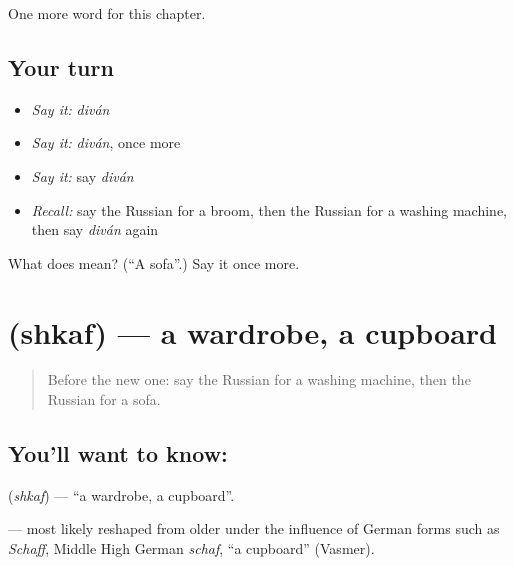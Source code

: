 \begin{grammarlens}[title={What you've built}]
One more word for this chapter.
\end{grammarlens}

\subsection*{Your turn}
\begin{itemize}
\raggedright
  \item \emph{Say it:} \emph{diván}
  \item \emph{Say it:} \emph{diván}, once more
  \item \emph{Say it:} say \emph{diván}
  \item \emph{Recall:} say the Russian for a broom, then the Russian for a washing machine, then say \emph{diván} again
\end{itemize}

\begin{tcolorbox}[breakable,colback=teal!4,colframe=teal!35!black,title={Before you move on}]
What does  mean? (\textquotedblleft{}A sofa\textquotedblright{}.) Say it once more.
\end{tcolorbox}
\section[\texorpdfstring{\ru{шкаф} (shkaf)}{шкаф (shkaf)}]{ (shkaf) — a wardrobe, a cupboard}

\label{lesson:RU-C97-wardrobe}



\begin{quote}
Before the new one: say the Russian for a washing machine, then the Russian for a sofa.
\end{quote}

\subsection*{You'll want to know: }
\textbf{} (\emph{shkaf}) — \textquotedblleft{}a wardrobe, a cupboard\textquotedblright{}.

\begin{cousinweb}
\textbf{} — most likely reshaped from older \emph{} under the influence of German forms such as \emph{Schaff}, Middle High German \emph{schaf}, \textquotedblleft{}a cupboard\textquotedblright{} (Vasmer).
\end{cousinweb}

